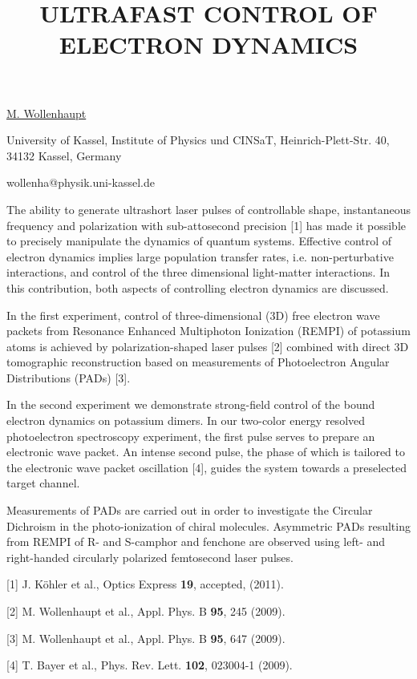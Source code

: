 \title{ULTRAFAST CONTROL OF ELECTRON DYNAMICS}

\underline{M. Wollenhaupt} 

{\normalsize{\vspace{-4mm}
University of Kassel, Institute of Physics und CINSaT, Heinrich-Plett-Str. 40, 34132 Kassel, Germany

\email wollenha@physik.uni-kassel.de}}

The ability to generate ultrashort laser pulses of controllable shape, instantaneous frequency and polarization with sub-attosecond precision [1] has made it possible to precisely manipulate the dynamics of quantum systems. Effective control of electron dynamics implies large population transfer rates, i.e. non-perturbative interactions, and control of the three dimensional light-matter interactions. In this contribution, both aspects of controlling electron dynamics are discussed.

In the first experiment, control of three-dimensional (3D) free electron wave packets from Resonance Enhanced Multiphoton Ionization (REMPI) of potassium atoms is achieved by polarization-shaped laser pulses [2] combined with direct 3D tomographic reconstruction based on measurements of Photoelectron Angular Distributions (PADs) [3].

In the second experiment we demonstrate strong-field control of the bound electron dynamics on potassium dimers. In our two-color energy resolved photoelectron spectroscopy experiment, the first pulse serves to prepare an electronic wave packet. An intense second pulse, the phase of which is tailored to the electronic wave packet oscillation [4], guides the system towards a preselected target channel.

Measurements of PADs are carried out in order to investigate the Circular Dichroism in the photo-ionization of chiral molecules. Asymmetric PADs resulting from REMPI of R- and S-camphor and fenchone are observed using left- and right-handed circularly polarized femtosecond laser pulses.

{\normalsize
[1] J. K\"{o}hler et al., Optics Express \textbf{19}, accepted, (2011).
\vsp

[2] M. Wollenhaupt et al., Appl. Phys. B \textbf{95}, 245 (2009).
\vsp

[3] M. Wollenhaupt et al., Appl. Phys. B \textbf{95}, 647 (2009).
\vsp

[4] T. Bayer et al., Phys. Rev. Lett. \textbf{102}, 023004-1 (2009).
}

\vspace{\baselineskip} 
